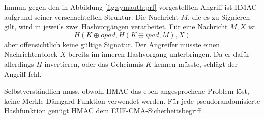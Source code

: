 Immun gegen den in Abbildung \ref{fig:symauth:prf} vorgestellten Angriff
ist HMAC aufgrund seiner verschachtelten Struktur. Die Nachricht $M$,
die es zu Signieren gilt, wird in jeweils zwei Hash\-vorgängen
verarbeitet. Für eine Nachricht $M,X$ ist
\begin{equation*}
 H(K \oplus \textit{opad}, H(K \oplus \textit{ipad}, M), X)
\end{equation*} 
aber offensichtlich keine gültige Signatur. Der
Angreifer müsste einen Nachrichtenblock $X$ bereits im inneren
Hashvorgang unterbringen. Da er dafür allerdings $H$ invertieren, oder
das Geheimnis $K$ kennen müsste, schlägt der Angriff fehl.

Selbstverständlich muss, obwohl HMAC das eben angesprochene Problem
löst, keine Merkle-Dåmgard-Funktion verwendet werden. Für jede
pseudorandomisierte Hashfunktion genügt HMAC dem
EUF-CMA-Sicherheitsbegriff.